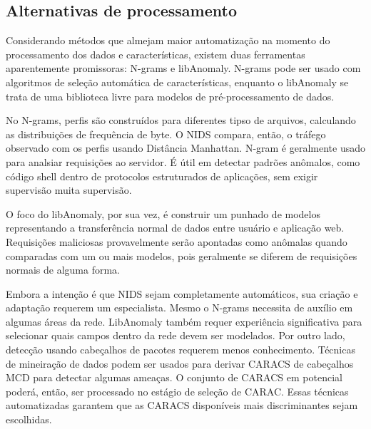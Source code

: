 \subsection{Alternativas de processamento}
Considerando métodos que almejam maior automatização na momento do processamento dos dados e características, existem
duas ferramentas aparentemente promissoras: N-grams e libAnomaly. N-grams pode ser usado com algoritmos de seleção
automática de características, enquanto o libAnomaly se trata de uma biblioteca livre para modelos de pré-processamento
de dados.
\par No N-grams, perfis são construídos para diferentes tipso de arquivos, calculando as distribuições de frequência
de byte. O NIDS compara, então, o tráfego observado com os perfis usando Distância Manhattan. N-gram é geralmente
usado para analsiar requisições ao servidor. É útil em detectar padrões anômalos, como código shell dentro de
protocolos estruturados de aplicações, sem exigir supervisão muita supervisão.
\par O foco do libAnomaly, por sua vez, é construir um punhado de modelos representando a transferência normal de
dados entre usuário e aplicação web. Requisições maliciosas provavelmente serão apontadas como anômalas quando
comparadas com um ou mais modelos, pois geralmente se diferem de requisições normais de alguma forma.
\par Embora a intenção é que NIDS sejam completamente automáticos, sua criação e adaptação requerem um especialista.
Mesmo o N-grams necessita de auxílio em algumas áreas da rede. LibAnomaly também requer experiência significativa
para selecionar quais campos dentro da rede devem ser modelados. Por outro lado, detecção usando cabeçalhos de
pacotes requerem menos conhecimento. Técnicas de mineiração de dados podem ser usados para derivar CARACS de
cabeçalhos MCD para detectar algumas ameaças. O conjunto de CARACS em potencial  poderá, então, ser processado no
estágio de seleção de CARAC. Essas técnicas automatizadas garantem que as CARACS disponíveis mais discriminantes sejam
escolhidas.
